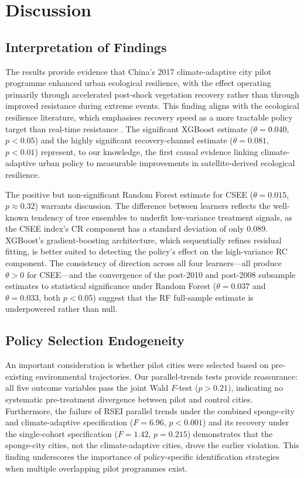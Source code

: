 \section{Discussion}
\label{sec:discussion}

\subsection{Interpretation of Findings}

The results provide evidence that China's 2017 climate-adaptive city
pilot programme enhanced urban ecological resilience, with the effect
operating primarily through accelerated post-shock vegetation recovery
rather than through improved resistance during extreme events. This
finding aligns with the ecological resilience literature, which
emphasises recovery speed as a more tractable policy target than
real-time resistance \citep{smith2023global,li2023widespread}. The
significant XGBoost estimate ($\theta = 0.040$, $p < 0.05$) and the
highly significant recovery-channel estimate ($\theta = 0.081$,
$p < 0.01$) represent, to our knowledge, the first causal evidence
linking climate-adaptive urban policy to measurable improvements in
satellite-derived ecological resilience.

The positive but non-significant Random Forest estimate for CSEE
($\theta = 0.015$, $p \approx 0.32$) warrants discussion. The
difference between learners reflects the well-known tendency of tree
ensembles to underfit low-variance treatment signals, as the CSEE
index's CR component has a standard deviation of only 0.089. XGBoost's
gradient-boosting architecture, which sequentially refines residual
fitting, is better suited to detecting the policy's effect on the
high-variance RC component. The consistency of direction across all
four learners---all produce $\theta > 0$ for CSEE---and the convergence
of the post-2010 and post-2008 subsample estimates to statistical
significance under Random Forest ($\theta = 0.037$ and $\theta = 0.033$,
both $p < 0.05$) suggest that the RF full-sample estimate is
underpowered rather than null.

\subsection{Policy Selection Endogeneity}

An important consideration is whether pilot cities were selected based
on pre-existing environmental trajectories. Our parallel-trends tests
provide reassurance: all five outcome variables pass the joint Wald
$F$-test ($p > 0.21$), indicating no systematic pre-treatment
divergence between pilot and control cities. Furthermore, the
failure of RSEI parallel trends under the combined sponge-city and
climate-adaptive specification ($F = 6.96$, $p < 0.001$) and its
recovery under the single-cohort specification ($F = 1.42$, $p = 0.215$)
demonstrates that the sponge-city cities, not the climate-adaptive
cities, drove the earlier violation. This finding underscores the
importance of policy-specific identification strategies when multiple
overlapping pilot programmes exist.

